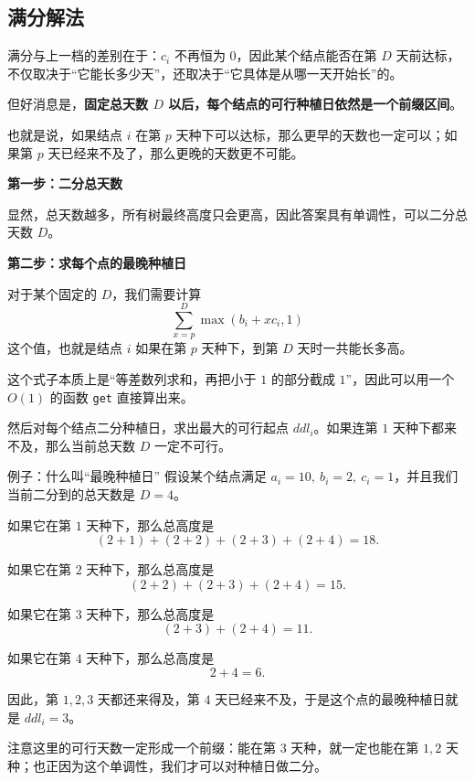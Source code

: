 \documentclass{book}
\newcommand{\code}[1]{\colorbox{codebg}{\texttt{#1}}}  %
\begin{document}
\newpage
\subsection{满分解法}

    满分与上一档的差别在于：$c_i$ 不再恒为 $0$，因此某个结点能否在第 $D$ 天前达标，不仅取决于“它能长多少天”，还取决于“它具体是从哪一天开始长”的。

    但好消息是，\textbf{固定总天数 $D$ 以后，每个结点的可行种植日依然是一个前缀区间}。

    也就是说，如果结点 $i$ 在第 $p$ 天种下可以达标，那么更早的天数也一定可以；如果第 $p$ 天已经来不及了，那么更晚的天数更不可能。

\par\medskip
\noindent\textbf{第一步：二分总天数}
\par\medskip

    显然，总天数越多，所有树最终高度只会更高，因此答案具有单调性，可以二分总天数 $D$。

\par\medskip
\noindent\textbf{第二步：求每个点的最晚种植日}
\par\medskip

    对于某个固定的 $D$，我们需要计算
    \[
    \sum_{x=p}^{D} \max(b_i + x c_i, 1)
    \]
    这个值，也就是结点 $i$ 如果在第 $p$ 天种下，到第 $D$ 天时一共能长多高。

    这个式子本质上是“等差数列求和，再把小于 $1$ 的部分截成 $1$”，因此可以用一个 $O(1)$ 的函数 \code{get} 直接算出来。

    然后对每个结点二分种植日，求出最大的可行起点 $ddl_i$。如果连第 $1$ 天种下都来不及，那么当前总天数 $D$ 一定不可行。

    \begin{keybox}{例子：什么叫“最晚种植日”}
        假设某个结点满足 $a_i = 10,\ b_i = 2,\ c_i = 1$，并且我们当前二分到的总天数是 $D = 4$。

        如果它在第 $1$ 天种下，那么总高度是
        \[
        (2+1) + (2+2) + (2+3) + (2+4) = 18.
        \]

        如果它在第 $2$ 天种下，那么总高度是
        \[
        (2+2) + (2+3) + (2+4) = 15.
        \]

        如果它在第 $3$ 天种下，那么总高度是
        \[
        (2+3) + (2+4) = 11.
        \]

        如果它在第 $4$ 天种下，那么总高度是
        \[
        2+4 = 6.
        \]

        因此，第 $1,2,3$ 天都还来得及，第 $4$ 天已经来不及，于是这个点的最晚种植日就是 $ddl_i = 3$。

        注意这里的可行天数一定形成一个前缀：能在第 $3$ 天种，就一定也能在第 $1,2$ 天种；也正因为这个单调性，我们才可以对种植日做二分。
    \end{keybox}
\end{document}

